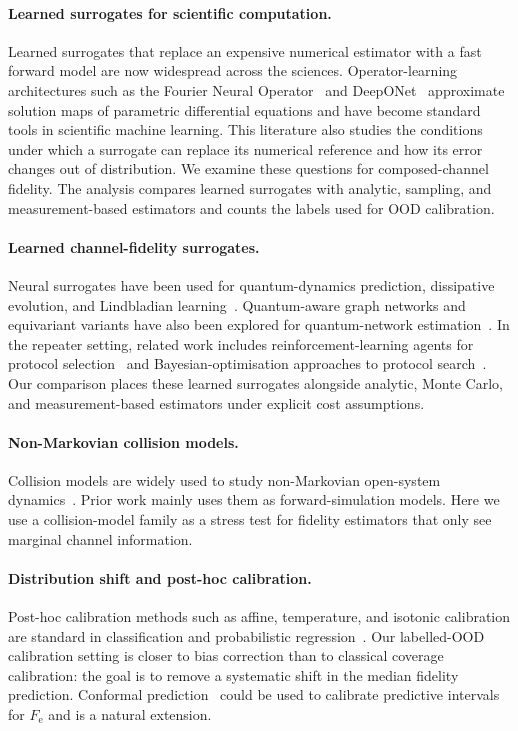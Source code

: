 \documentclass[12pt]{iopart}
\newcommand{\Fe}{F_{\mathrm{e}}}
\begin{document}
\paragraph*{Learned surrogates for scientific computation.}
Learned surrogates that replace an expensive numerical estimator with a fast forward model are now widespread across the sciences. Operator-learning architectures such as the Fourier Neural Operator~\cite{fno} and DeepONet~\cite{deeponet} approximate solution maps of parametric differential equations and have become standard tools in scientific machine learning. This literature also studies the conditions under which a surrogate can replace its numerical reference and how its error changes out of distribution. We examine these questions for composed-channel fidelity. The analysis compares learned surrogates with analytic, sampling, and measurement-based estimators and counts the labels used for OOD calibration.

\paragraph*{Learned channel-fidelity surrogates.}
Neural surrogates have been used for quantum-dynamics prediction, dissipative evolution, and Lindbladian learning~\cite{nn_channel_seq,nn_supop}. Quantum-aware graph networks and equivariant variants have also been explored for quantum-network estimation~\cite{deepsets_channels,gnn_channels}. In the repeater setting, related work includes reinforcement-learning agents for protocol selection~\cite{nn_repeater} and Bayesian-optimisation approaches to protocol search~\cite{repeater_BO_external}. Our comparison places these learned surrogates alongside analytic, Monte Carlo, and measurement-based estimators under explicit cost assumptions.

\paragraph*{Non-Markovian collision models.}
Collision models are widely used to study non-Markovian open-system dynamics~\cite{ciccarello_collision_review,collision_app}. Prior work mainly uses them as forward-simulation models. Here we use a collision-model family as a stress test for fidelity estimators that only see marginal channel information.

\paragraph*{Distribution shift and post-hoc calibration.}
Post-hoc calibration methods such as affine, temperature, and isotonic calibration are standard in classification and probabilistic regression~\cite{guo_calibration,kuleshov_calibrated}. Our labelled-OOD calibration setting is closer to bias correction than to classical coverage calibration: the goal is to remove a systematic shift in the median fidelity prediction. Conformal prediction~\cite{conformal_review} could be used to calibrate predictive intervals for $\Fe$ and is a natural extension.
\end{document}
